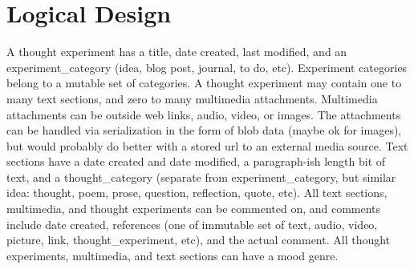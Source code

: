 \section{Logical Design}
A thought experiment has a title, date created, last modified, and an experiment\_category (idea, blog post, journal, to do, etc). Experiment categories belong to a mutable set of categories.  A thought experiment may contain one to many text sections, and zero to many multimedia attachments.  Multimedia attachments can be outside web links, audio, video, or images.  The attachments can be handled via serialization in the form of blob data (maybe ok for images), but would probably do better with a stored url to an external media source.  Text sections have a date created and date modified, a paragraph-ish length bit of text, and a thought\_category (separate from experiment\_category, but similar idea: thought, poem, prose, question, reflection, quote, etc).  All text sections, multimedia, and thought experiments can be commented on, and comments include date created, references (one of immutable set of {text, audio, video, picture, link, thought\_experiment, etc}), and the actual comment.  All thought experiments, multimedia, and text sections can have a mood genre.
 

